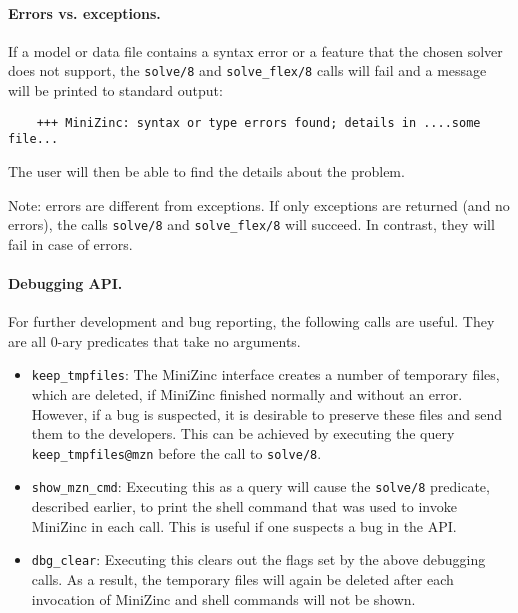 \paragraph{Errors vs. exceptions.}
If a model or data file contains a syntax error or a feature that the
chosen solver does not support, the \texttt{solve/8} and
\texttt{solve\_flex/8} calls will fail and a message will be printed to
standard output:
\begin{verbatim}
    +++ MiniZinc: syntax or type errors found; details in ....some file...
\end{verbatim}
The user will then be able to find the details about the problem.

Note: errors are different from exceptions. If only exceptions are returned
(and no errors), the calls \texttt{solve/8} and \texttt{solve\_flex/8} will
succeed. In contrast, they will fail in case of errors.

\paragraph{Debugging API.}
For further development and bug reporting, the following calls are useful.
They are all 0-ary predicates that take no arguments.
\begin{itemize}
\item  \texttt{keep\_tmpfiles}: The MiniZinc interface creates a number of
  temporary files, which are deleted, if MiniZinc finished normally and
  without an error. However, if a bug is suspected, it is desirable to
  preserve these files and send them to the developers. 
  This can be achieved by executing the query
  \texttt{keep\_tmpfiles@mzn}
  before the call to \texttt{solve/8}.
\item \texttt{show\_mzn\_cmd}: Executing this as a query will cause the
  \texttt{solve/8} predicate, described earlier, to print the shell command
  that was used to invoke MiniZinc in each call.
  This is useful if one suspects a bug in the API.
\item \texttt{dbg\_clear}: Executing this clears out the flags set by the
  above debugging calls. As a result, the temporary files will again be
  deleted after each invocation of MiniZinc and shell commands will not be
  shown.
\end{itemize}



